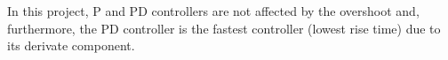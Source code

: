 In this project, P and PD controllers are not affected by the overshoot and, furthermore, the PD controller is the fastest controller (lowest rise time) due to its derivate component.

\begin{figure}[H]
	\hfill
	\hfill
	\hfill
	\\
	\hfill

\end{figure}
